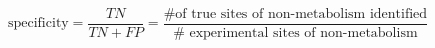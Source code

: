 \begin{equation}
\mathrm{specificity} = \frac{TN}{TN + FP} = \frac{\text{\# of true sites of non-metabolism identified}}{\text{\#\ experimental\ sites\ of\ non-metabolism}}
\end{equation}
